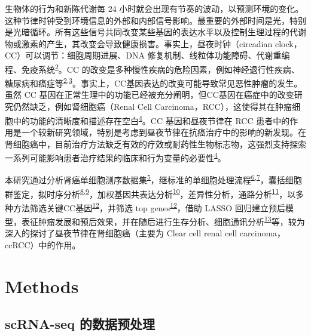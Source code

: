 \documentclass[
]{article}
\begin{document}
生物体的行为和新陈代谢每 24 小时就会出现有节奏的波动，以预测环境的变化。这种节律时钟受到环境信息的外部和内部信号影响。最重要的外部时间是光，特别是光暗循环。所有这些信号共同改变某些基因的表达水平以及控制生理过程的代谢物或激素的产生，其改变会导致健康损害。事实上，昼夜时钟（circadian clock，CC）可以调节：细胞周期进展、DNA 修复机制、线粒体功能障碍、代谢重编程、免疫系统\textsuperscript{\protect\hyperlink{ref-ChronotherapyAmiama2022}{2}}。CC 的改变是多种慢性疾病的危险因素，例如神经退行性疾病、糖尿病和癌症等\textsuperscript{\protect\hyperlink{ref-ChronotherapyAmiama2022}{2},\protect\hyperlink{ref-CancerAndTheShafi2019}{3}}。事实上，CC基因表达的改变可能导致常见恶性肿瘤的发生。虽然 CC 基因在正常生理中的功能已经被充分阐明，但CC基因在癌症中的改变研究仍然缺乏，例如肾细胞癌（Renal Cell Carcinoma，RCC），这使得其在肿瘤细胞中的功能的清晰度和描述存在空白\textsuperscript{\protect\hyperlink{ref-RoleOfClockGSanton2023}{4}}。CC 基因和昼夜节律在 RCC 患者中的作用是一个较新研究领域，特别是考虑到昼夜节律在抗癌治疗中的影响的新发现。在肾细胞癌中，目前治疗方法缺乏有效的疗效或耐药性生物标志物，这强烈支持探索一系列可能影响患者治疗结果的临床和行为变量的必要性\textsuperscript{\protect\hyperlink{ref-RoleOfClockGSanton2023}{4}}。

本研究通过分析肾癌单细胞测序数据集\textsuperscript{\protect\hyperlink{ref-IntegrativeSinYuZh2023}{5}}，继标准的单细胞处理流程\textsuperscript{\protect\hyperlink{ref-IntegratedAnalHaoY2021}{6},\protect\hyperlink{ref-ComprehensiveIStuart2019}{7}}，囊括细胞群鉴定，拟时序分析\textsuperscript{\protect\hyperlink{ref-ReversedGraphQiuX2017}{8},\protect\hyperlink{ref-TheDynamicsAnTrapne2014}{9}}，加权基因共表达分析\textsuperscript{\protect\hyperlink{ref-WgcnaAnRPacLangfe2008}{10}}，差异性分析，通路分析\textsuperscript{\protect\hyperlink{ref-ClusterprofilerWuTi2021}{11}}，以多种方法筛选关键CC基因\textsuperscript{\protect\hyperlink{ref-EfsAnEnsemblNeuman2017}{12}}，并筛选 top genes\textsuperscript{\protect\hyperlink{ref-EfsAnEnsemblNeuman2017}{12}}，借助 LASSO 回归建立预后模型，表征肿瘤发展和预后效果，并在随后进行生存分析、细胞通讯分析\textsuperscript{\protect\hyperlink{ref-InferenceAndAJinS2021}{13}}等，较为深入的探讨了昼夜节律在肾细胞癌（主要为 Clear cell renal cell carcinoma，ccRCC）中的作用。

\hypertarget{methods}{%
\section{Methods}\label{methods}}

\hypertarget{scrna-seq-ux7684ux6570ux636eux9884ux5904ux7406}{%
\subsection{scRNA-seq 的数据预处理}\label{scrna-seq-ux7684ux6570ux636eux9884ux5904ux7406}}
\end{document}

